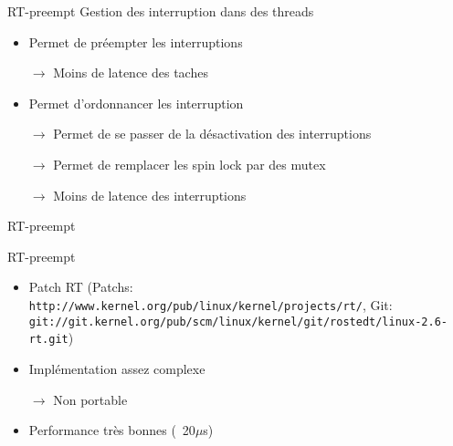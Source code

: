 
\begin{frame}{RT-preempt} %
  Gestion des interruption dans des threads
  \begin{itemize}
    \item Permet de préempter les interruptions
    \item[$\to$] Moins de latence des taches
    \item Permet d'ordonnancer les interruption
    \item[$\to$]  Permet   de  se  passer  de   la  désactivation  des
      interruptions
    \item[$\to$] Permet de remplacer les spin lock par des mutex
    \item[$\to$] Moins de latence des interruptions
  \end{itemize}
\end{frame}

\begin{frame}{RT-preempt} 
  \begin{center}
  \end{center}
\end{frame}

\begin{frame}{RT-preempt}
 \begin{itemize}
  \item Patch RT (Patchs: \texttt{http://www.kernel.org/pub/linux/kernel/projects/rt/}, Git: \texttt{git://git.kernel.org/pub/scm/linux/kernel/git/rostedt/linux-2.6-rt.git})
  \item Implémentation assez complexe
  \item[$\to$] Non portable
  \item Performance très bonnes (~20$\mu$s)
 \end{itemize}
\end{frame}

